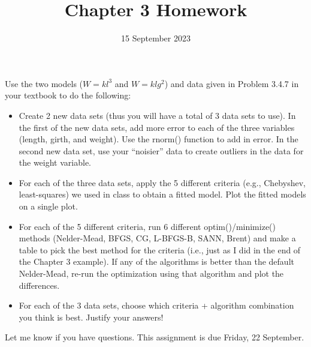 \documentclass{article}
\title{Chapter 3 Homework}
\date{15 September 2023}
\begin{document}
\maketitle

Use the two models ($W = kl^3$ and $W = klg^2$) and data given in Problem 3.4.7 in your textbook to do the following: 

\begin{itemize}
    \item Create 2 new data sets (thus you will have a total of 3 data sets to use). In the first of the new data sets, add more error to each of the three variables (length, girth, and weight). Use the rnorm()  function to add in error. In the second new data set, use your ``noisier'' data to create outliers in the data for the weight variable. 
    \item For each of the three data sets, apply the 5 different criteria (e.g., Chebyshev, least-squares) we used in class to obtain a fitted model. Plot the fitted models on a single plot.
    \item For each of the 5 different criteria, run 6 different optim()/minimize() methods (Nelder-Mead, BFGS, CG, L-BFGS-B, SANN, Brent) and make a table to pick the best method for the criteria (i.e., just as I did in the end of the Chapter 3 example). If any of the algorithms is better than the default Nelder-Mead, re-run the optimization using that algorithm and plot the differences.
    \item For each of the 3 data sets, choose which criteria + algorithm combination you think is best. Justify your answers!
\end{itemize}


Let me know if you have questions. This assignment is due Friday, 22 September. 
\end{document}
